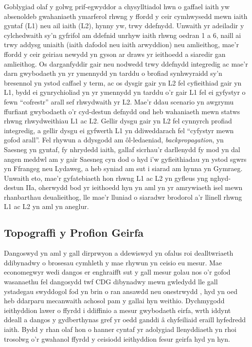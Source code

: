 Goblygiad olaf y golwg prif-egwyddor a chysylltiadol hwn o gaffael iaith yw absenoldeb gwahaniaeth ymarferol rhwng y ffordd y ceir cymhwysedd mewn iaith gyntaf (L1) neu ail iaith (L2), hynny yw, trwy ddefnydd. Unwaith yr adeiladir y cylchedwaith sy'n gyfrifol am ddefnid unrhyw iaith rhwng oedran 1 a 6, naill ai trwy addysg uniaith (iaith dafodol neu iaith arwyddion) neu amlieithog, mae'r ffordd y ceir geiriau newydd yn gyson ar draws yr ieithoedd a siaredir gan amlieithog. Os darganfyddir gair neu nodwedd trwy ddefnydd integredig ac mae'r darn gwybodaeth yn yr ymennydd yn tarddu o brofiad synhwyraidd sy'n bresennol yn ystod caffael y term, ac os dysgir gair yn L2 fel cyfieithiad gair yn L1, bydd ei gynrychioliad yn yr ymennydd yn tarddu o'r gair L1 fel ei gyfystyr o fewn ``cofrestr'' arall sef rhwydwaith yr L2. Mae'r ddau scenario yn awgrymu ffurfiant gwybodaeth o'r cyd-destun defnydd ond heb wahaniaeth mewn statws rhwng rhwydweithiau L1 ac L2. Gellir dysgu gair yn L2 fel cynnyrch profiad integredig, a gellir dysgu ei gyfwerth L1 yn ddiweddarach fel ``cyfystyr mewn gofod arall''. Fel rhywun a ddysgodd am ôl-ledaeniad, \textit{backpropagation}, yn Saesneg yn gyntaf, fy nhrydedd iaith, gallaf sicrhau'r darllenydd fy mod yn dal angen meddwl am y gair Saesneg cyn dod o hyd i'w gyfieithiadau yn ystod sgwrs yn Ffrangeg neu Lydaweg, a heb syniad am sut i siarad am hynna yn Gymraeg. Unwaith eto, mae'r gyfatebiaeth hon rhwng L1 ac L2 yn gyfleus yng nghyd-destun IIa, oherwydd bod yr ieithoedd hyn yn aml yn yr amrywiaeth isel mewn rhanbarthau deualieithog, lle mae'r lluniad o siaradwr brodorol a'r llinell rhwng L1 ac L2 yn aml yn aneglur.

\subsection{Topograffi y Profion Geirfa}
Dangoswyd yn aml y gall dirprwyon a ddewiswyd yn ofalus roi dealltwriaeth ddibynadwy o brosesau cymhleth y mae rhywun yn ceisio eu mesur. Mae economegwyr wedi dangos er enghraifft sut y gall mesur golau nos o'r gofod wasanaethu fel dangosydd twf CDG dibynadwy mewn gwledydd lle gall ystadegau swyddogol fod yn brin o ran ansawdd neu onestrwydd \parencite{henderson_measuring_2009}, hyd yn oed heb ddarparu mecanwaith achosol pam y gallai hyn weithio. Dychmygodd ieithyddion lawer o ffyrdd i ddiffinio a mesur gwybodaeth eirfa, wrth iddynt ddeall a dangos y gydberthynas gref yr oedd ganddi â chyfeiliaid eraill hyfedredd iaith. Bydd y rhan olaf hon o hanner cyntaf yr adolygiad llenyddiaeth yn rhoi trosolwg o'r gwahanol ffyrdd y ceisiodd ieithyddion fesur geirfa hyd yn hyn.

